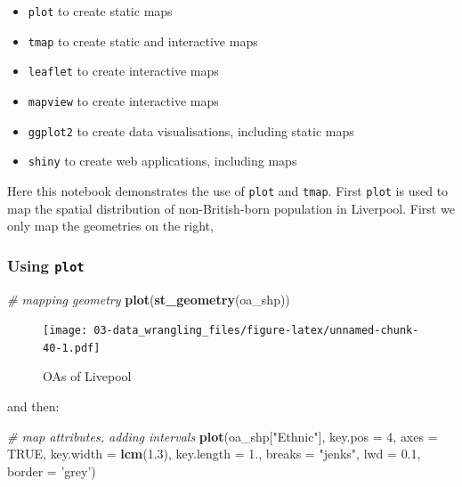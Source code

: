 \documentclass[
]{book}
\newenvironment{Shaded}{\begin{snugshade}}{\end{snugshade}}
\newcommand{\CommentTok}[1]{\textcolor[rgb]{0.56,0.35,0.01}{\textit{#1}}}
\newcommand{\DataTypeTok}[1]{\textcolor[rgb]{0.13,0.29,0.53}{#1}}
\newcommand{\DecValTok}[1]{\textcolor[rgb]{0.00,0.00,0.81}{#1}}
\newcommand{\FloatTok}[1]{\textcolor[rgb]{0.00,0.00,0.81}{#1}}
\newcommand{\KeywordTok}[1]{\textcolor[rgb]{0.13,0.29,0.53}{\textbf{#1}}}
\newcommand{\NormalTok}[1]{#1}
\newcommand{\OtherTok}[1]{\textcolor[rgb]{0.56,0.35,0.01}{#1}}
\newcommand{\StringTok}[1]{\textcolor[rgb]{0.31,0.60,0.02}{#1}}
\providecommand{\tightlist}{%
  \setlength{\itemsep}{0pt}\setlength{\parskip}{0pt}}
\begin{document}
\begin{itemize}
\tightlist
\item
  \texttt{plot} to create static maps
\item
  \texttt{tmap} to create static and interactive maps
\item
  \texttt{leaflet} to create interactive maps
\item
  \texttt{mapview} to create interactive maps
\item
  \texttt{ggplot2} to create data visualisations, including static maps
\item
  \texttt{shiny} to create web applications, including maps
\end{itemize}

Here this notebook demonstrates the use of \texttt{plot} and \texttt{tmap}. First \texttt{plot} is used to map the spatial distribution of non-British-born population in Liverpool. First we only map the geometries on the right,

\hypertarget{using-plot}{%
\subsubsection{\texorpdfstring{Using \texttt{plot}}{Using plot}}\label{using-plot}}

\begin{Shaded}
\begin{Highlighting}[]
\CommentTok{# mapping geometry}
\KeywordTok{plot}\NormalTok{(}\KeywordTok{st_geometry}\NormalTok{(oa_shp))}
\end{Highlighting}
\end{Shaded}

\begin{figure}
\centering
\texttt{[image: 03-data\_wrangling\_files/figure-latex/unnamed-chunk-40-1.pdf]}
\caption{\label{fig:unnamed-chunk-40}OAs of Livepool}
\end{figure}

and then:

\begin{Shaded}
\begin{Highlighting}[]
\CommentTok{# map attributes, adding intervals}
\KeywordTok{plot}\NormalTok{(oa_shp[}\StringTok{"Ethnic"}\NormalTok{], }\DataTypeTok{key.pos =} \DecValTok{4}\NormalTok{, }\DataTypeTok{axes =} \OtherTok{TRUE}\NormalTok{, }\DataTypeTok{key.width =} \KeywordTok{lcm}\NormalTok{(}\FloatTok{1.3}\NormalTok{), }\DataTypeTok{key.length =} \FloatTok{1.}\NormalTok{,}
     \DataTypeTok{breaks =} \StringTok{"jenks"}\NormalTok{, }\DataTypeTok{lwd =} \FloatTok{0.1}\NormalTok{, }\DataTypeTok{border =} \StringTok{'grey'}\NormalTok{) }
\end{Highlighting}
\end{Shaded}
\end{document}
